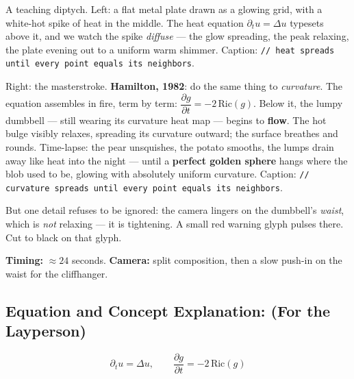 \documentclass[11pt]{article}
\begin{document}
A teaching diptych. Left: a flat metal plate drawn as a glowing grid, with a white-hot
spike of heat in the middle. The heat equation \( \partial_t u = \Delta u \) typesets
above it, and we watch the spike \emph{diffuse} --- the glow spreading, the peak
relaxing, the plate evening out to a uniform warm shimmer. Caption: \texttt{// heat
spreads until every point equals its neighbors}.

Right: the masterstroke. \textbf{Hamilton, 1982}: do the same thing to
\emph{curvature}. The equation assembles in fire, term by term:
\( \dfrac{\partial g}{\partial t} = -2\,\mathrm{Ric}(g) \).
Below it, the lumpy dumbbell --- still wearing its curvature heat map --- begins to
\textbf{flow}. The hot bulge visibly relaxes, spreading its curvature outward; the
surface breathes and rounds. Time-lapse: the pear unsquishes, the potato smooths, the
lumps drain away like heat into the night --- until a \textbf{perfect golden sphere}
hangs where the blob used to be, glowing with absolutely uniform curvature. Caption:
\texttt{// curvature spreads until every point equals its neighbors}.

But one detail refuses to be ignored: the camera lingers on the dumbbell's
\emph{waist}, which is \emph{not} relaxing --- it is tightening. A small red warning
glyph pulses there. Cut to black on that glyph.

\textbf{Timing:} $\approx 24$ seconds. \textbf{Camera:} split composition, then a
slow push-in on the waist for the cliffhanger.

\subsection*{Equation and Concept Explanation: (For the Layperson)}

\[
\partial_t u = \Delta u, \qquad \frac{\partial g}{\partial t} = -2\,\mathrm{Ric}(g)
\]
\end{document}
